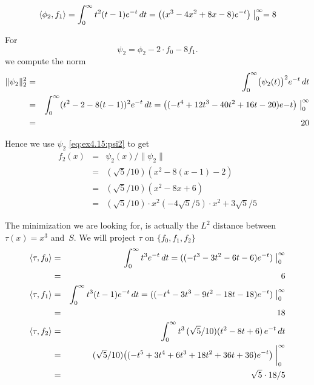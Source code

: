 \begin{enumerate}
\begin{equation*}
\langle \phi_2, f_1 \rangle
 = \int_0^\infty t^2(t-1) e^{-t}\,dt
 = \left((x^3-4x^2+8x-8) e^{-t}\right)\bigm|_0^\infty
 = 8
\end{equation*}

For
\begin{equation} \label{eq:ex4.15:psi2}
\psi_2 = \phi_2 - 2\cdot f_0 -8f_1.
\end{equation}
we compute the norm
\begin{eqnarray*}
\|\psi_2\|_2^2
 &=& \int_0^\infty \bigl(\psi_2(t)\bigr)^2 e^{-t}\,dt  \\
 &=& \int_0^\infty (t^2 - 2 - 8(t-1))^2 e^{-t}\,dt
      = \left((-t^4+12t^3-40t^2+16t-20)e{-t}\right)\bigm|_0^\infty \\
 &=& 20
\end{eqnarray*}

Hence we use \(\psi_2\) \eqref{eq:ex4.15:psi2} to get
\begin{eqnarray*}
f_2(x)
 &=& \psi_2(x)/\|\psi_2\| \\
 &=& (\sqrt{5}/10)(x^2 -8(x-1) -2) \\
 &=& (\sqrt{5}/10)(x^2 -8x + 6) \\
 &=& (\sqrt{5}/10)\cdot x^2 (-4\sqrt{5}/5)\cdot x^2 + 3\sqrt{5}/5
\end{eqnarray*}


The minimization we are looking for, is actually the \(L^2\) distance
between \(\tau(x) = x^3\) and~$S$.
We will project \(\tau\) on \(\{f_0,f_1,f_2\}\)
\begin{eqnarray*}
\langle \tau, f_0\rangle &=&
 \int_0^\infty t^3 e^{-t} \,dt
    = ((-t^3 -3t^2 -6t -6)e^{-t})\bigm|_0^\infty  \\
 &=& 6 \\
\langle \tau, f_1\rangle
&=& \int_0^\infty t^3(t-1)e^{-t} \,dt
    = ((-t^4 -3t^3 -9t^2 -18t -18)e^{-t})\bigm|_0^\infty  \\
 &=& 18 \\
\langle \tau, f_2\rangle
 &=&  \int_0^\infty t^3\,(\sqrt{5}/10)(t^2 - 8t + 6)\, e^{-t} \,dt \\
 &=&  (\sqrt{5}/10)
      \bigl((-t^5 + 3t^4 + 6t^3 +18t^2 +36t +36)e^{-t}\bigr)\biggm|_0^\infty \\
 &=&  \sqrt{5}\cdot 18/5
\end{eqnarray*}


\end{enumerate}

